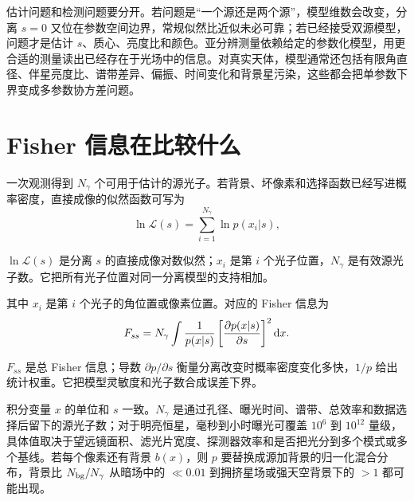 估计问题和检测问题要分开。若问题是“一个源还是两个源”，模型维数会改变，分离 \(s=0\) 又位在参数空间边界，常规似然比近似未必可靠；若已经接受双源模型，问题才是估计 \(s\)、质心、亮度比和颜色。亚分辨测量依赖给定的参数化模型，用更合适的测量读出已经存在于光场中的信息。对真实天体，模型通常还包括有限角直径、伴星亮度比、谱带差异、偏振、时间变化和背景星污染，这些都会把单参数下界变成多参数协方差问题。

\section{Fisher 信息在比较什么}

一次观测得到 \(N_\gamma\) 个可用于估计的源光子。若背景、坏像素和选择函数已经写进概率密度，直接成像的似然函数可写为
\begin{equation}
  \ln \mathcal{L}(s)=\sum_{i=1}^{N_\gamma}\ln p(x_i|s),
  \label{eq:ch08-direct-likelihood}
\end{equation}
\begin{formulaexplain}
\(\ln\mathcal L(s)\) 是分离 \(s\) 的直接成像对数似然；\(x_i\) 是第 \(i\) 个光子位置，\(N_\gamma\) 是有效源光子数。它把所有光子位置对同一分离模型的支持相加。
\end{formulaexplain}
其中 \(x_i\) 是第 \(i\) 个光子的角位置或像素位置。对应的 Fisher 信息为
\begin{equation}
  F_{ss}=N_\gamma \int
  \frac{1}{p(x|s)}
  \left[\frac{\partial p(x|s)}{\partial s}\right]^2{\rm d}x .
  \label{eq:ch08-fisher-direct}
\end{equation}
\begin{formulaexplain}
\(F_{ss}\) 是总 Fisher 信息；导数 \(\partial p/\partial s\) 衡量分离改变时概率密度变化多快，\(1/p\) 给出统计权重。它把模型灵敏度和光子数合成误差下界。
\end{formulaexplain}
积分变量 \(x\) 的单位和 \(s\) 一致。\(N_\gamma\) 是通过孔径、曝光时间、谱带、总效率和数据选择后留下的源光子数；对于明亮恒星，毫秒到小时曝光可覆盖 \(10^6\) 到 \(10^{12}\) 量级，具体值取决于望远镜面积、滤光片宽度、探测器效率和是否把光分到多个模式或多个基线。若每个像素还有背景 \(b(x)\)，则 \(p\) 要替换成源加背景的归一化混合分布，背景比 \(N_{\rm bg}/N_\gamma\) 从暗场中的 \(\ll 0.01\) 到拥挤星场或强天空背景下的 \(>1\) 都可能出现。

